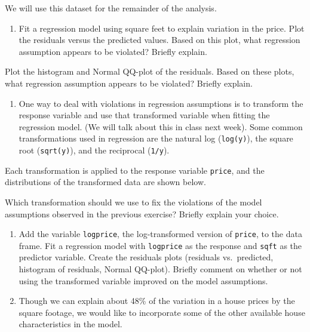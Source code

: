 \documentclass[]{book}
\providecommand{\tightlist}{%
  \setlength{\itemsep}{0pt}\setlength{\parskip}{0pt}}
\begin{document}
We will use this dataset for the remainder of the analysis.

\begin{enumerate}
\def\labelenumi{\arabic{enumi}.}
\setcounter{enumi}{3}
\tightlist
\item
  Fit a regression model using square feet to explain variation in the
  price. Plot the residuals versus the predicted values. Based on this
  plot, what regression assumption appears to be violated? Briefly
  explain.
\end{enumerate}

Plot the histogram and Normal QQ-plot of the residuals. Based on these
plots, what regression assumption appears to be violated? Briefly
explain.

\begin{enumerate}
\def\labelenumi{\arabic{enumi}.}
\setcounter{enumi}{4}
\tightlist
\item
  One way to deal with violations in regression assumptions is to
  transform the response variable and use that transformed variable when
  fitting the regression model. (We will talk about this in class next
  week). Some common transformations used in regression are the natural
  log (\texttt{log(y)}), the square root (\texttt{sqrt(y)}), and the
  reciprocal (\texttt{1/y}).
\end{enumerate}

Each transformation is applied to the response variable \texttt{price},
and the distributions of the transformed data are shown below.

Which transformation should we use to fix the violations of the model
assumptions observed in the previous exercise? Briefly explain your
choice.

\begin{enumerate}
\def\labelenumi{\arabic{enumi}.}
\setcounter{enumi}{5}
\item
  Add the variable \texttt{logprice}, the log-transformed version of
  \texttt{price}, to the data frame. Fit a regression model with
  \texttt{logprice} as the response and \texttt{sqft} as the predictor
  variable. Create the residuals plots (residuals vs.~predicted,
  histogram of residuals, Normal QQ-plot). Briefly comment on whether or
  not using the transformed variable improved on the model assumptions.
\item
  Though we can explain about 48\% of the variation in a house prices by
  the square footage, we would like to incorporate some of the other
  available house characteristics in the model.
\end{enumerate}
\end{document}
